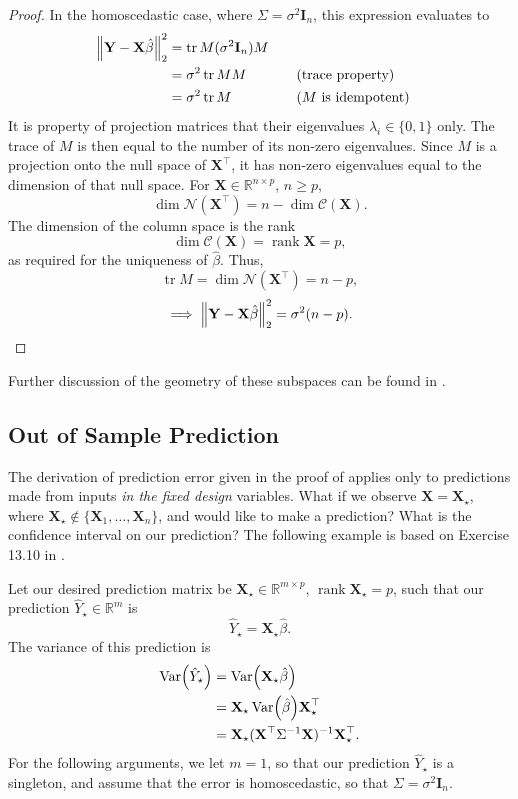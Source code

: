 \documentclass[letterpaper, reqno]{amsart}
\numberwithin{equation}{section}
\DeclarePairedDelimiter{\norm}{\lVert}{\rVert}
\newcommand{\T}{\top} %
\newcommand{\vect}[1]{\boldsymbol{\mathbf{#1}}} %
\newcommand{\Var}[1]{\operatorname{Var}\mleft(#1\mright)}
\newcommand{\R}{\mathbb{R}}  %
\newcommand{\by}[1]{&\quad&\text{(#1)}}
\newcommand{\Xm}{\vect{X}}
\newcommand{\Yv}{\vect{Y}}
\newcommand{\Xv}{\vect{X}}
\newcommand{\Bvh}{\hat{\beta}}
\newcommand{\Xs}{\Xv_\star}
\newcommand{\Yhs}{\hat{Y}_\star}
\DeclareMathOperator{\tr}{tr}
\DeclareMathOperator{\rank}{rank}
\begin{document}
\begin{proof}
  In the homoscedastic case, where $\Sigma = \sigma^2 \vect{I}_n$, this expression
  evaluates to 
  \begin{alignat*}{3}
    \norm*{\Yv - \Xm\Bvh}_2^2 &= \tr M(\sigma^2 \vect{I}_n) M \\
    &= \sigma^2 \tr M M \by{trace property} \\
    &= \sigma^2 \tr M \by {$M$ is idempotent}
  \end{alignat*}
  It is property of projection matrices that their eigenvalues $\lambda_i \in
  \{0, 1\}$ only.
  The trace of $M$ is then equal to the number of its non-zero eigenvalues.
  Since $M$ is a projection onto the null space of $\Xm^\T$, it has non-zero
  eigenvalues equal to the dimension of that null space.
  For $\Xm \in \R^{n \times p}$, $n \ge p$,
  \[ \dim\mathscr{N}(\Xm^\T) = n - \dim \mathscr{C}(\Xm). \]
  The dimension of the column space is the rank
  \[ \dim \mathscr{C}(\Xm) = \rank \Xm = p, \]
  as required for the uniqueness of $\Bvh$. Thus,
  \[ \tr M = \dim\mathscr{N}(\Xm^\T) = n - p, \]
  \[ \implies \norm*{\Yv - \Xm\Bvh}_2^2 = \sigma^2 (n - p). \qedhere \]
\end{proof}
Further discussion of the geometry of these subspaces can be found in
\cite{davidson2004econometric}.

\subsection{Out of Sample Prediction}
The derivation of prediction error given in the proof of 
applies only to predictions made from inputs \emph{in the fixed design}
variables. What if we observe $\Xm = \Xs$,
where $\Xs \notin \{\Xv_1, \dots, \Xv_n \}$,
and would like to make a prediction?
What is the confidence interval on our prediction? The following example is
based on Exercise 13.10 in \cite{wasserman2013all}.

Let our desired prediction matrix be $\Xs \in \R^{m \times p}$, $\rank \Xs = p$, 
such that our prediction $\Yhs \in \R^m$ is
\[ \Yhs = \Xs \Bvh. \]
The variance of this prediction is
\begin{align*}
   \Var{\Yhs} &= \Var{\Xs \Bvh}  \\
   &= \Xs \Var{\Bvh} \Xs^\T \\
   &= \Xs (\Xm^\T \Sigma^{-1} \Xm)^{-1} \Xs^\T.
\end{align*}
For the following arguments, we let $m = 1$, so that our prediction $\Yhs$ is
a singleton, and assume that the error is homoscedastic, so that 
$\Sigma = \sigma^2 \vect{I}_n$.
\end{document}
